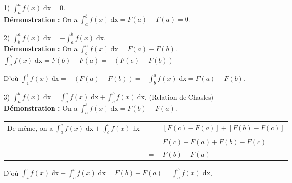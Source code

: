 \begin{itemize}
\item[1)] $\displaystyle \int_a^a f(x) \; \mathrm{dx} = 0$. \\

\textbf{Démonstration :} On a $\displaystyle \int_a^b f(x) \; \mathrm{dx} = F(a) - F(a) = 0$. \\

\item[2)] $\displaystyle \int_b^a f(x) \; \mathrm{dx} = -\displaystyle \int_a^b f(x) \; \mathrm{dx}$. \\

\textbf{Démonstration :} On a $\displaystyle \int_b^a f(x) \; \mathrm{dx} = F(a) - F(b)$. \\

$\displaystyle \int_a^b f(x) \; \mathrm{dx} = F(b) - F(a) = -\left(F(a) - F(b)\right)$ 

\vspace*{.2cm}

D'où $\displaystyle \int_a^b f(x) \; \mathrm{dx} = -\left(F(a) - F(b)\right) = -\displaystyle \int_b^a f(x) \; \mathrm{dx} = F(a) - F(b)$. \\

\item[3)] $\displaystyle \int_a^b f(x) \; \mathrm{dx} = \displaystyle \int_a^c f(x) \; \mathrm{dx} + \displaystyle \int_c^b f(x) \; \mathrm{dx}$. (Relation de Chasles) \\

\textbf{Démonstration :} On a $\displaystyle \int_a^b f(x) \; \mathrm{dx} = F(b) - F(a)$. \\

\begin{tabular}{lll}
\hspace*{-.3cm} De même, on a $\displaystyle \int_a^c f(x) \; \mathrm{dx} + \displaystyle \int_c^b f(x) \; \mathrm{dx}$ & $=$ & $\left[F\left(c\right) - F\left(a\right)\right] + \left[F\left(b\right) - F\left(c\right)\right]$ \\
& $=$ & $F\left(c\right) - F\left(a\right) + F\left(b\right) - F\left(c\right)$ \\
& $=$ & $F\left(b\right) - F\left(a\right)$ \\
\end{tabular}

\vspace*{.2cm}

D'où $\displaystyle \int_a^c f(x) \; \mathrm{dx} + \displaystyle \int_c^b f(x) \; \mathrm{dx} = F\left(b\right) - F\left(a\right) = \displaystyle \int_a^b f(x) \; \mathrm{dx}$. \\


\end{itemize}
